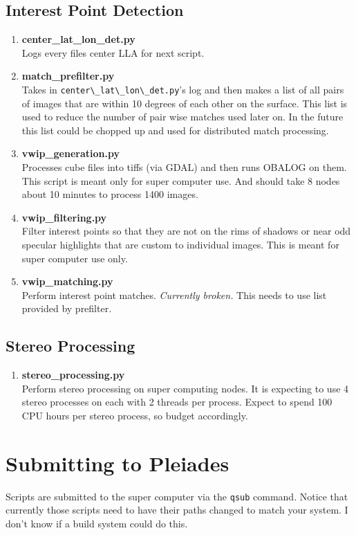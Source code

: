\documentclass[12pt]{article}
\begin{document}
\subsection*{Interest Point Detection}

\begin{enumerate}

\item \textbf{center\_lat\_lon\_det.py} \hfill \\
  Logs every files center LLA for next script.

\item \textbf{match\_prefilter.py} \hfill \\
  Takes in \verb#center\_lat\_lon\_det.py#'s log and then makes a list of all pairs of images that are within 10 degrees of each other on the surface. This list is used to reduce the number of pair wise matches used later on. In the future this list could be chopped up and used for distributed match processing.

\item \textbf{vwip\_generation.py} \hfill \\
  Processes cube files into tiffs (via GDAL) and then runs OBALOG on them. This script is meant only for super computer use. And should take 8 nodes about 10 minutes to process 1400 images.

\item \textbf{vwip\_filtering.py} \hfill \\
  Filter interest points so that they are not on the rims of shadows or near odd specular highlights that are custom to individual images. This is meant for super computer use only.

\item \textbf{vwip\_matching.py} \hfill \\
  Perform interest point matches. \emph{Currently broken.} This needs to use list provided by prefilter.

\end{enumerate}

\subsection*{Stereo Processing}

\begin{enumerate}

\item \textbf{stereo\_processing.py} \hfill \\
  Perform stereo processing on super computing nodes. It is expecting to use 4 stereo processes on each with 2 threads per process. Expect to spend 100 CPU hours per stereo process, so budget accordingly.

\end{enumerate}

\section*{Submitting to Pleiades}

Scripts are submitted to the super computer via the \verb#qsub# command. Notice that currently those scripts need to have their paths changed to match your system. I don't know if a build system could do this.
\end{document}
